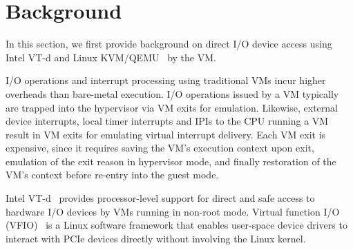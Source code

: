 
\section{Background}
\vspace{-0.05in}
In this section, we first provide background on direct I/O
device access using Intel VT-d and Linux KVM/QEMU~\cite{kvm}
by the VM.

I/O operations and interrupt processing using traditional VMs
incur higher overheads than bare-metal execution. I/O
operations issued by a VM typically are trapped into the
hypervisor via VM exits for emulation. Likewise, external
device interrupts, local timer interrupts and IPIs to the CPU
running a VM result in VM exits for emulating virtual
interrupt delivery. Each VM exit is expensive, since it
requires saving the VM's execution context upon exit,
emulation of the exit reason in hypervisor mode, and finally
restoration of the VM's context before re-entry into the guest
mode.

Intel VT-d~\cite{intelvtd-paper} provides processor-level
support for direct and safe access to hardware I/O devices by
VMs running in non-root mode.  Virtual function I/O
(VFIO)~\cite{vfio} is a Linux software framework that enables
user-space device drivers to interact with PCIe devices
directly without involving the Linux kernel.  

%
%
%
%
%
\vspace{-0.1in}
